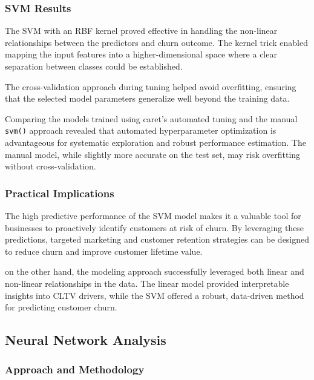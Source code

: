 \documentclass[
]{article}
\begin{document}
\hypertarget{svm-results}{%
\subsubsection{SVM Results}\label{svm-results}}

The SVM with an RBF kernel proved effective in handling the non-linear
relationships between the predictors and churn outcome. The kernel trick
enabled mapping the input features into a higher-dimensional space where
a clear separation between classes could be established.

The cross-validation approach during tuning helped avoid overfitting,
ensuring that the selected model parameters generalize well beyond the
training data.

Comparing the models trained using caret's automated tuning and the
manual \texttt{svm()} approach revealed that automated hyperparameter
optimization is advantageous for systematic exploration and robust
performance estimation. The manual model, while slightly more accurate
on the test set, may risk overfitting without cross-validation.

\hypertarget{practical-implications}{%
\subsubsection{Practical Implications}\label{practical-implications}}

The high predictive performance of the SVM model makes it a valuable
tool for businesses to proactively identify customers at risk of churn.
By leveraging these predictions, targeted marketing and customer
retention strategies can be designed to reduce churn and improve
customer lifetime value.

on the other hand, the modeling approach successfully leveraged both
linear and non-linear relationships in the data. The linear model
provided interpretable insights into CLTV drivers, while the SVM offered
a robust, data-driven method for predicting customer churn.

\hypertarget{neural-network-analysis}{%
\subsection{Neural Network Analysis}\label{neural-network-analysis}}

\hypertarget{approach-and-methodology}{%
\subsubsection{Approach and
Methodology}\label{approach-and-methodology}}
\end{document}

